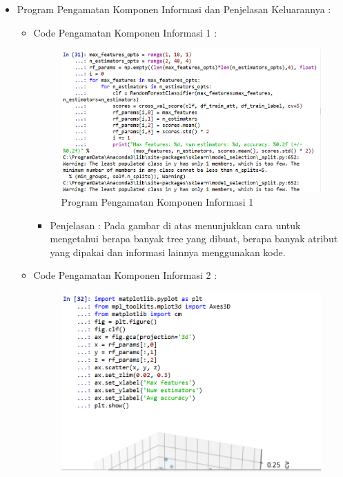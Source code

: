 \begin{enumerate}
\begin{itemize}
\begin{itemize}
\par
\par
\item Program Pengamatan Komponen Informasi dan Penjelasan Keluarannya :
\begin{itemize}
\item Code Pengamatan Komponen Informasi 1 :
\par
\begin{figure}[ht]
\centering
\includegraphics[scale=0.7]{figures/andi/RF30.PNG}
\caption{Program Pengamatan Komponen Informasi 1}
\label{contoh}
\end{figure}
\par
\begin{itemize}
\item Penjelasan : Pada gambar di atas menunjukkan cara untuk mengetahui berapa banyak tree yang dibuat, berapa banyak atribut yang dipakai dan informasi lainnya menggunakan kode.
\par 
\par
\end{itemize}
\item Code Pengamatan Komponen Informasi 2 :
\par
\begin{figure}[ht]
\centering
\includegraphics[scale=0.7]{figures/andi/RF31.PNG}

\end{figure}
\end{itemize}
\end{itemize}
\end{itemize}
\end{enumerate}
